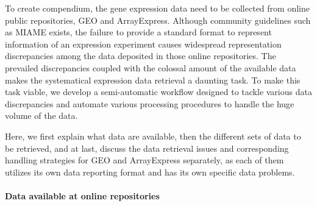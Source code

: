 

To create compendium, the gene expression data need to be collected from
online public repositories, GEO and ArrayExpress.
%
Although community guidelines such as MIAME \cite{Brazma2001} exists, the
failure to provide a standard format to represent information of an expression
experiment causes widespread representation discrepancies among the data
deposited in those online repositories.
%
The prevailed discrepancies coupled with the colossal amount of the available
data makes the systematical expression data retrieval a daunting task.
%
To make this task viable, we develop a semi-automatic workflow designed to
tackle various data discrepancies and automate various processing procedures
to handle the huge volume of the data.


Here, we first explain what data are available, then the different sets of data
to be retrieved, and at last, discuss the data retrieval issues and 
corresponding handling strategies for GEO and ArrayExpress separately, as each 
of them utilizes its own data reporting format and has its own specific data 
problems.



\paragraph{Data available at online repositories}\label{sec:command-data-content-online}

